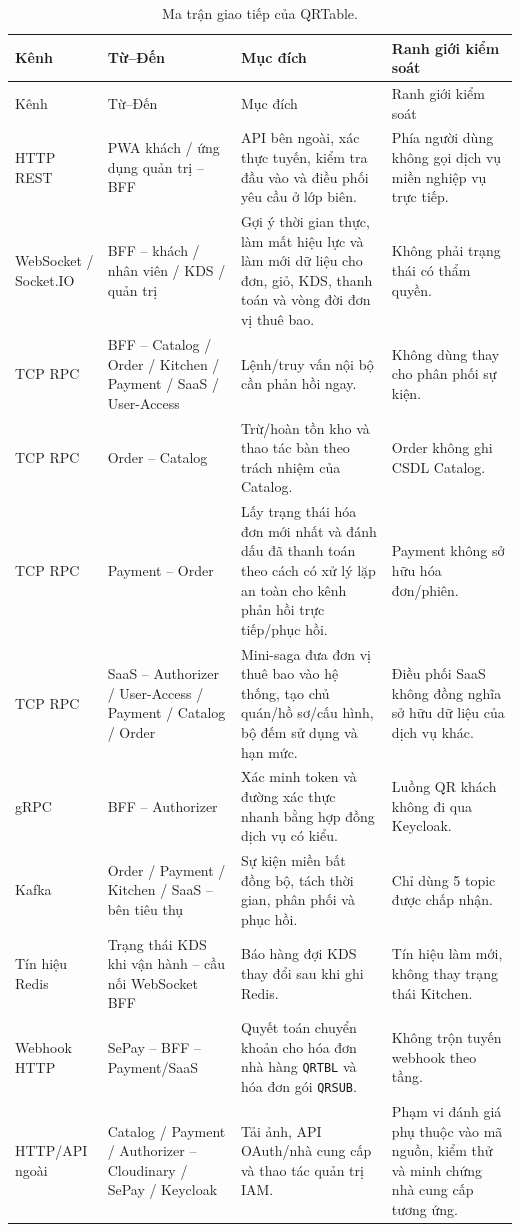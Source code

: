 {\footnotesize
\setlength{\tabcolsep}{3pt}
\begin{longtable}{>{\raggedright\arraybackslash}p{}>{\raggedright\arraybackslash}p{}>{\raggedright\arraybackslash}p{}>{\raggedright\arraybackslash}p{}}
  \caption{Ma trận giao tiếp của QRTable.}
  \label{tab:chapter4-communication-matrix}\\
  \toprule
  Kênh & Từ--Đến & Mục đích & Ranh giới kiểm soát \\
  \midrule
  \endfirsthead
  \toprule
  Kênh & Từ--Đến & Mục đích & Ranh giới kiểm soát \\
  \midrule
  \endhead
  \bottomrule
  \endfoot
  HTTP REST & PWA khách / ứng dụng quản trị -- BFF & API bên ngoài, xác thực tuyến, kiểm tra đầu vào và điều phối yêu cầu ở lớp biên. & Phía người dùng không gọi dịch vụ miền nghiệp vụ trực tiếp. \\
  WebSocket / Socket.IO & BFF -- khách / nhân viên / KDS / quản trị & Gợi ý thời gian thực, làm mất hiệu lực và làm mới dữ liệu cho đơn, giỏ, KDS, thanh toán và vòng đời đơn vị thuê bao. & Không phải trạng thái có thẩm quyền. \\
  TCP RPC & BFF -- Catalog / Order / Kitchen / Payment / SaaS / User-Access & Lệnh/truy vấn nội bộ cần phản hồi ngay. & Không dùng thay cho phân phối sự kiện. \\
  TCP RPC & Order -- Catalog & Trừ/hoàn tồn kho và thao tác bàn theo trách nhiệm của Catalog. & Order không ghi CSDL Catalog. \\
  TCP RPC & Payment -- Order & Lấy trạng thái hóa đơn mới nhất và đánh dấu đã thanh toán theo cách có xử lý lặp an toàn cho kênh phản hồi trực tiếp/phục hồi. & Payment không sở hữu hóa đơn/phiên. \\
  TCP RPC & SaaS -- Authorizer / User-Access / Payment / Catalog / Order & Mini-saga đưa đơn vị thuê bao vào hệ thống, tạo chủ quán/hồ sơ/cấu hình, bộ đếm sử dụng và hạn mức. & Điều phối SaaS không đồng nghĩa sở hữu dữ liệu của dịch vụ khác. \\
  gRPC & BFF -- Authorizer & Xác minh token và đường xác thực nhanh bằng hợp đồng dịch vụ có kiểu. & Luồng QR khách không đi qua Keycloak. \\
  Kafka & Order / Payment / Kitchen / SaaS -- bên tiêu thụ & Sự kiện miền bất đồng bộ, tách thời gian, phân phối và phục hồi. & Chỉ dùng 5 topic được chấp nhận. \\
  Tín hiệu Redis & Trạng thái KDS khi vận hành -- cầu nối WebSocket BFF & Báo hàng đợi KDS thay đổi sau khi ghi Redis. & Tín hiệu làm mới, không thay trạng thái Kitchen. \\
  Webhook HTTP & SePay -- BFF -- Payment/SaaS & Quyết toán chuyển khoản cho hóa đơn nhà hàng \texttt{QRTBL} và hóa đơn gói \texttt{QRSUB}. & Không trộn tuyến webhook theo tầng. \\
HTTP/API ngoài & Catalog / Payment / Authorizer -- Cloudinary / SePay / Keycloak & Tải ảnh, API OAuth/nhà cung cấp và thao tác quản trị IAM. & Phạm vi đánh giá phụ thuộc vào mã nguồn, kiểm thử và minh chứng nhà cung cấp tương ứng. \\
\end{longtable}
}

